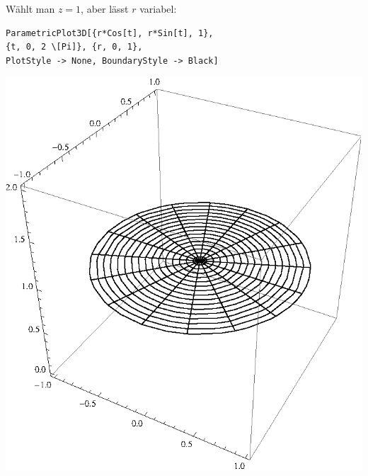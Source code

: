 \documentclass[10pt,a4paper]{scrartcl}
\begin{document}
\begin{enumerate}[(i)]
\begin{minipage}{0.50\columnwidth}
\end{minipage}
\begin{minipage}{0.50\columnwidth}
Wählt man $z = 1$, aber lässt $r$ variabel:
\begin{lstlisting}[caption= Mathematica Code für den Graph von Z]
ParametricPlot3D[{r*Cos[t], r*Sin[t], 1}, 
{t, 0, 2 \[Pi]}, {r, 0, 1}, 
PlotStyle -> None, BoundaryStyle -> Black]
\end{lstlisting}
\end{minipage}
\begin{minipage}{0.50\columnwidth}
\begin{center}
\includegraphics[scale=0.7]{1iv2.eps} 
\end{center}
\end{minipage}
\end{enumerate}
\end{document}
